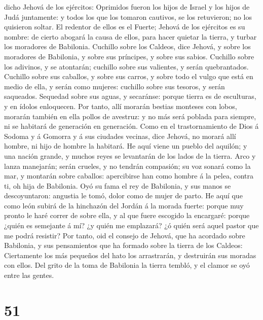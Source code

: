 dicho Jehová de los ejércitos: Oprimidos fueron los hijos de Israel y
los hijos de Judá juntamente: y todos los que los tomaron cautivos, se
los retuvieron; no los quisieron soltar.  El redentor de
ellos es el Fuerte; Jehová de los ejércitos es su nombre: de cierto
abogará la causa de ellos, para hacer quietar la tierra, y turbar los
moradores de Babilonia.  Cuchillo sobre los Caldeos, dice
Jehová, y sobre los moradores de Babilonia, y sobre sus príncipes, y
sobre sus sabios.  Cuchillo sobre los adivinos, y se
atontarán; cuchillo sobre sus valientes, y serán quebrantados.
 Cuchillo sobre sus caballos, y sobre sus carros, y sobre
todo el vulgo que está en medio de ella, y serán como mujeres: cuchillo
sobre sus tesoros, y serán saqueados.  Sequedad sobre sus
aguas, y secaránse: porque tierra es de esculturas, y en ídolos
enloquecen.  Por tanto, allí morarán bestias monteses con
lobos, morarán también en ella pollos de avestruz: y no más será poblada
para siempre, ni se habitará de generación en generación.
 Como en el trastornamiento de Dios á Sodoma y á Gomorra
y á sus ciudades vecinas, dice Jehová, no morará allí hombre, ni hijo de
hombre la habitará.  He aquí viene un pueblo del aquilón;
y una nación grande, y muchos reyes se levantarán de los lados de la
tierra.  Arco y lanza manejarán; serán crueles, y no
tendrán compasión; su voz sonará como la mar, y montarán sobre caballos:
apercibirse han como hombre á la pelea, contra ti, oh hija de Babilonia.
 Oyó su fama el rey de Babilonia, y sus manos se
descoyuntaron: angustia le tomó, dolor como de mujer de parto.
 He aquí que como león subirá de la hinchazón del Jordán
á la morada fuerte: porque muy pronto le haré correr de sobre ella, y al
que fuere escogido la encargaré: porque ¿quién es semejante á mí? ¿y
quién me emplazará? ¿ó quién será aquel pastor que me podrá resistir?
 Por tanto, oid el consejo de Jehová, que ha acordado
sobre Babilonia, y sus pensamientos que ha formado sobre la tierra de
los Caldeos: Ciertamente los más pequeños del hato los arrastrarán, y
destruirán sus moradas con ellos.  Del grito de la toma
de Babilonia la tierra tembló, y el clamor se oyó entre las gentes.

\hypertarget{section-50}{%
\section{51}\label{section-50}}

